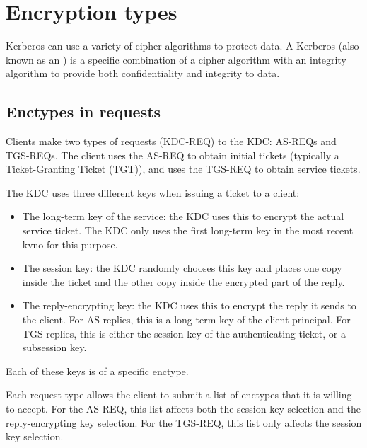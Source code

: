 \documentclass[letterpaper,10pt,english]{sphinxmanual}
\begin{document}
\chapter{Encryption types}
\label{\detokenize{admin/enctypes:enctypes}}\label{\detokenize{admin/enctypes::doc}}\label{\detokenize{admin/enctypes:encryption-types}}
Kerberos can use a variety of cipher algorithms to protect data.  A
Kerberos  (also known as an ) is a
specific combination of a cipher algorithm with an integrity algorithm
to provide both confidentiality and integrity to data.


\section{Enctypes in requests}
\label{\detokenize{admin/enctypes:enctypes-in-requests}}
Clients make two types of requests (KDC-REQ) to the KDC: AS-REQs and
TGS-REQs.  The client uses the AS-REQ to obtain initial tickets
(typically a Ticket-Granting Ticket (TGT)), and uses the TGS-REQ to
obtain service tickets.

The KDC uses three different keys when issuing a ticket to a client:
\begin{itemize}
\item {} 
The long-term key of the service: the KDC uses this to encrypt the
actual service ticket.  The KDC only uses the first long-term key in
the most recent kvno for this purpose.

\item {} 
The session key: the KDC randomly chooses this key and places one
copy inside the ticket and the other copy inside the encrypted part
of the reply.

\item {} 
The reply-encrypting key: the KDC uses this to encrypt the reply it
sends to the client.  For AS replies, this is a long-term key of the
client principal.  For TGS replies, this is either the session key of the
authenticating ticket, or a subsession key.

\end{itemize}

Each of these keys is of a specific enctype.

Each request type allows the client to submit a list of enctypes that
it is willing to accept.  For the AS-REQ, this list affects both the
session key selection and the reply-encrypting key selection.  For the
TGS-REQ, this list only affects the session key selection.
\end{document}
